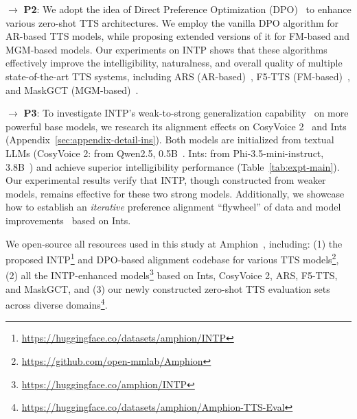 \documentclass[11pt]{article}
\begin{document}
$\rightarrow$ \textbf{P2}: We adopt the idea of Direct Preference Optimization (DPO)~\cite{dpo} to enhance various zero-shot TTS architectures. We employ the vanilla DPO algorithm for AR-based TTS models, while proposing extended versions of it for FM-based and MGM-based models. Our experiments on INTP shows that these algorithms effectively improve the intelligibility, naturalness, and overall quality of multiple state-of-the-art TTS systems, including ARS (AR-based)~\cite{maskgct}, F5-TTS (FM-based)~\cite{f5tts}, and MaskGCT (MGM-based)~\cite{maskgct}.


$\rightarrow$ \textbf{P3}: To investigate INTP's weak-to-strong generalization capability~\cite{weak-to-strong-generalization} on more powerful base models, we research its alignment effects on CosyVoice 2~\cite{cosyvoice2} and Ints (Appendix~\ref{sec:appendix-detail-ins}). Both models are initialized from textual LLMs (CosyVoice 2: from Qwen2.5, 0.5B~\cite{qwen2}. Ints: from Phi-3.5-mini-instruct, 3.8B~\cite{phi3}) and achieve superior intelligibility performance (Table~\ref{tab:expt-main}). Our experimental results verify that INTP, though constructed from weaker models, remains effective for these two strong models. Additionally, we showcase how to establish an \textit{iterative} preference alignment ``flywheel'' of data and model improvements~\cite{RLHF-anthoropic,llama3,iterative-dpo} based on Ints.

We open-source all resources used in this study at Amphion~\cite{amphion}, including: (1) the proposed INTP\footnote{\href{https://huggingface.co/datasets/amphion/INTP}{https://huggingface.co/datasets/amphion/INTP}} and DPO-based alignment codebase for various TTS models\footnote{\href{https://github.com/open-mmlab/Amphion}{https://github.com/open-mmlab/Amphion}}, (2) all the INTP-enhanced models\footnote{\href{https://huggingface.co/amphion/INTP}{https://huggingface.co/amphion/INTP}} based on Ints, CosyVoice 2, ARS, F5-TTS, and MaskGCT, and (3) our newly constructed zero-shot TTS evaluation sets across diverse domains\footnote{\href{https://huggingface.co/datasets/amphion/Amphion-TTS-Eval}{https://huggingface.co/datasets/amphion/Amphion-TTS-Eval}}.
\end{document}
